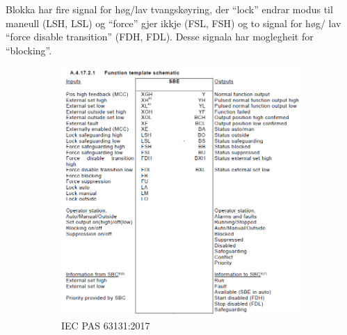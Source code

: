 Blokka har fire signal for høg/lav tvangskøyring, der ``lock'' endrar modus til maneull (LSH, LSL) og ``force'' gjer ikkje (FSL, FSH)
og to signal for høg/ lav ``force disable transition'' (FDH, FDL).
Desse signala har moglegheit for ``blocking''.

\newpage

\begin{figure}[htbp]
    \centering
    \begin{subfigure}[b]{0.46\textwidth}
        \centering
        \includegraphics[width=1\textwidth]{Bilder/SBEBlokkIEC.png}
        \caption{\gls{IEC} \gls{PAS} 63131:2017 \citep{SBE}}\label{fig:Switch Binary Electrical blokk IEC}
    \end{subfigure}
    \hfill
    \begin{subfigure}[b]{0.46\textwidth}
        \centering

\end{subfigure}
\end{figure}
